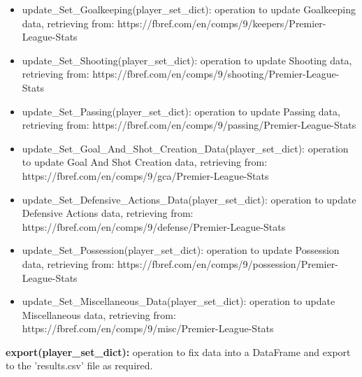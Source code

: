 \documentclass[12pt]{report}
\begin{document}
{\begin{itemize}
	\item update\_Set\_Goalkeeping(player\_set\_dict): operation to update Goalkeeping data, retrieving from: https://fbref.com/en/comps/9/keepers/Premier-League-Stats
	\item update\_Set\_Shooting(player\_set\_dict): operation to update Shooting data, retrieving from: https://fbref.com/en/comps/9/shooting/Premier-League-Stats
	\item update\_Set\_Passing(player\_set\_dict): operation to update Passing data, retrieving from: https://fbref.com/en/comps/9/passing/Premier-League-Stats
	\item update\_Set\_Goal\_And\_Shot\_Creation\_Data(player\_set\_dict): operation to update Goal And Shot Creation data, retrieving from: https://fbref.com/en/comps/9/gca/Premier-League-Stats
	\item update\_Set\_Defensive\_Actions\_Data(player\_set\_dict): operation to update Defensive Actions data, retrieving from: https://fbref.com/en/comps/9/defense/Premier-League-Stats
	\item update\_Set\_Possession(player\_set\_dict): operation to update Possession data, retrieving from: https://fbref.com/en/comps/9/possession/Premier-League-Stats
	\item update\_Set\_Miscellaneous\_Data(player\_set\_dict): operation to update Miscellaneous data, retrieving from: https://fbref.com/en/comps/9/misc/Premier-League-Stats
\end{itemize}
\textbf{export(player\_set\_dict):} operation to fix data into a DataFrame and export to the 'results.csv' file as required.
}
\end{document}
